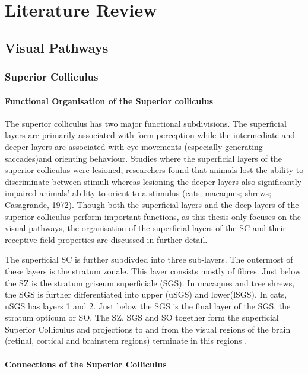 \chapter{Literature Review}

\section{Visual Pathways}

\subsection{Superior Colliculus}


\subsubsection{Functional Organisation of the Superior colliculus}

The superior colliculus has two major functional subdivisions. The superficial layers are primarily associated with form perception while the intermediate and deeper layers are associated with eye movements (especially generating saccades)and orienting behaviour. Studies where the superficial layers of the superior colliculus were lesioned, researchers found that animals lost the ability to discriminate between stimuli whereas lesioning the deeper layers also significantly impaired animals' ability to orient to a stimulus (cats; macaques; shrews; Casagrande, 1972). Though both the superficial layers and the deep layers of the superior colliculus perform important functions, as this thesis only focuses on the visual pathways, the organisation of the superficial layers of the SC and their receptive field properties are discussed in further detail.

The superficial SC is further subdivded into three sub-layers. The outermost of these layers is the stratum zonale. This layer consists mostly of fibres. Just below the SZ is the stratum griseum superficiale (SGS). In macaques and tree shrews, the SGS is further differentiated into upper (uSGS) and lower(lSGS). In cats, uSGS has layers 1 and 2. Just below the SGS is the final layer of the SGS, the stratum opticum or SO. The SZ, SGS and SO together form the superficial Superior Colliculus and projections to and from the visual regions of the brain (retinal, cortical and brainstem regions) terminate in this regions \cite{Swisher2010}.
\subsubsection{Connections of the Superior Colliculus}


